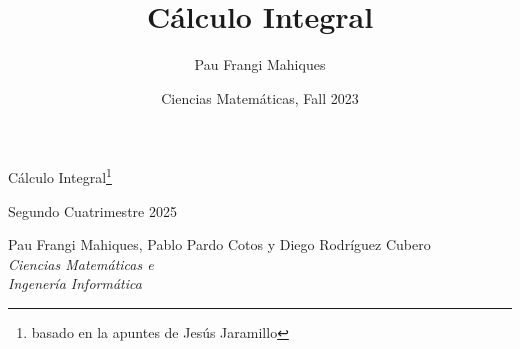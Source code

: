 \documentclass[a4paper,11pt,final]{article}
\title{Cálculo Integral}
\date{Ciencias Matemáticas, Fall 2023}
\author{Pau Frangi Mahiques}
\begin{document}
\begin{titlepage}
    \centering\Large\null\vfill

    {\Huge Cálculo Integral\footnote{basado en la apuntes de Jesús Jaramillo}}\\ 
    \vspace{1em}

    Segundo Cuatrimestre 2025\\
    \vskip8cm

    Pau Frangi Mahiques, Pablo Pardo Cotos y Diego Rodríguez Cubero\\

    \emph{Ciencias Matemáticas e\\Ingenería Informática}\\
    \vskip4cm
\end{titlepage}

\newpage
\pagestyle{plain}    
\tableofcontents
\newpage


\end{document}
